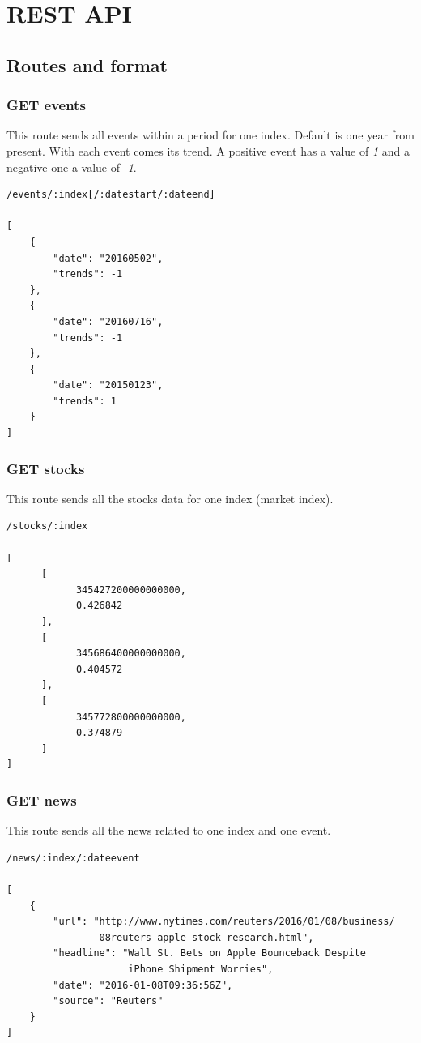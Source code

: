 \section{REST API}

\subsection{Routes and format}

\subsubsection*{GET events}
This route sends all events within a period for one index. Default is one year from present. With each event comes its trend. A positive event has a value of \textit{1} and a negative one a value of \textit{-1}.
\begin{verbatim}
/events/:index[/:datestart/:dateend]

[
    {
        "date": "20160502",
        "trends": -1
    },
    {
        "date": "20160716",
        "trends": -1
    },
    {
        "date": "20150123",
        "trends": 1
    }
]
\end{verbatim}

\subsubsection*{GET stocks}
This route sends all the stocks data for one index (market index).
\begin{verbatim}
/stocks/:index

[
      [
            345427200000000000,
            0.426842
      ],
      [
            345686400000000000,
            0.404572
      ],
      [
            345772800000000000,
            0.374879
      ]
]
\end{verbatim}

\subsubsection*{GET news}
This route sends all the news related to one index and one event.
\begin{verbatim}
/news/:index/:dateevent

[
    {
        "url": "http://www.nytimes.com/reuters/2016/01/08/business/
                08reuters-apple-stock-research.html",
        "headline": "Wall St. Bets on Apple Bounceback Despite
                     iPhone Shipment Worries",
        "date": "2016-01-08T09:36:56Z",
        "source": "Reuters"
    }
]
\end{verbatim}

